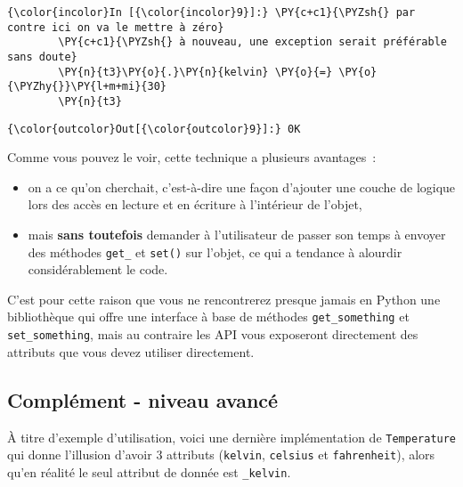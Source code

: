     \begin{Verbatim}[commandchars=\\\{\}]
{\color{incolor}In [{\color{incolor}9}]:} \PY{c+c1}{\PYZsh{} par contre ici on va le mettre à zéro}
        \PY{c+c1}{\PYZsh{} à nouveau, une exception serait préférable sans doute}
        \PY{n}{t3}\PY{o}{.}\PY{n}{kelvin} \PY{o}{=} \PY{o}{\PYZhy{}}\PY{l+m+mi}{30}
        \PY{n}{t3}
\end{Verbatim}


\begin{Verbatim}[commandchars=\\\{\}]
{\color{outcolor}Out[{\color{outcolor}9}]:} 0K
\end{Verbatim}
            
    Comme vous pouvez le voir, cette technique a plusieurs avantages~:

\begin{itemize}
\tightlist
\item
  on a ce qu'on cherchait, c'est-à-dire une façon d'ajouter une couche
  de logique lors des accès en lecture et en écriture à l'intérieur de
  l'objet,
\item
  mais \textbf{sans toutefois} demander à l'utilisateur de passer son
  temps à envoyer des méthodes \texttt{get\_} et \texttt{set()} sur
  l'objet, ce qui a tendance à alourdir considérablement le code.
\end{itemize}

C'est pour cette raison que vous ne rencontrerez presque jamais en
Python une bibliothèque qui offre une interface à base de méthodes
\texttt{get\_something} et \texttt{set\_something}, mais au contraire
les API vous exposeront directement des attributs que vous devez
utiliser directement.

    \hypertarget{compluxe9ment---niveau-avancuxe9}{%
\subsection{Complément - niveau
avancé}\label{compluxe9ment---niveau-avancuxe9}}

    À titre d'exemple d'utilisation, voici une dernière implémentation de
\texttt{Temperature} qui donne l'illusion d'avoir 3 attributs
(\texttt{kelvin}, \texttt{celsius} et \texttt{fahrenheit}), alors qu'en
réalité le seul attribut de donnée est \texttt{\_kelvin}.

